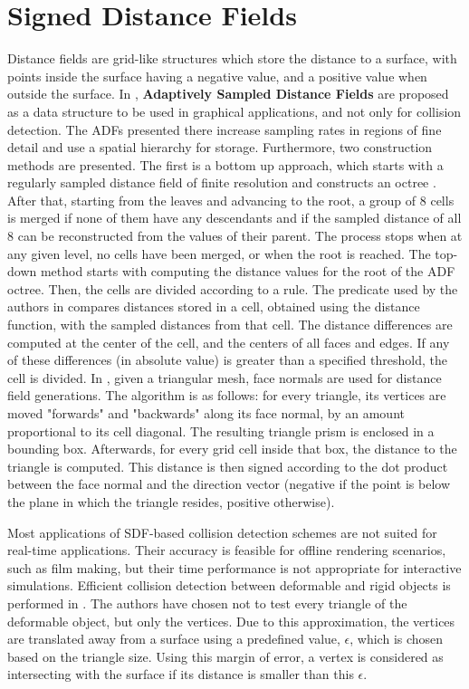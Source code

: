 \section{Signed Distance Fields}
\label{sec:sdf}

Distance fields are grid-like structures which store the distance to a surface, with points inside the surface having a negative value, and a positive value when outside the surface. In \citep{fris00}, \textbf{Adaptively Sampled Distance Fields} are proposed as a data structure to be used in graphical applications, and not only for collision detection. The ADFs presented there increase sampling rates in regions of fine detail and use a spatial hierarchy for storage. Furthermore, two construction methods are presented. The first is a bottom up approach, which starts with a regularly sampled distance field of finite resolution and constructs an octree \citep{fris00}. After that, starting from the leaves and advancing to the root, a group of 8 cells is merged if none of them have any descendants and if the sampled distance of all 8 can be reconstructed from the values of their parent. The process stops when at any given level, no cells have been merged, or when the root is reached. The top-down method starts with computing the distance values for the root of the ADF octree. Then, the cells are divided according to a rule. The predicate used by the authors in \citep{fris00} compares distances stored in a cell, obtained using the distance function, with the sampled distances from that cell. The distance differences are computed at the center of the cell, and the centers of all faces and edges. If any of these differences (in absolute value) is greater than a specified threshold, the cell is divided. In \citep{fsg03}, given a triangular mesh, face normals are used for distance field generations. The algorithm is as follows: for every triangle, its vertices are moved "forwards" and "backwards" along its face normal, by an amount proportional to its cell diagonal. The resulting triangle prism is enclosed in a bounding box. Afterwards, for every grid cell inside that box, the distance to the triangle is computed. This distance is then signed according to the dot product between the face normal and the direction vector (negative if the point is below the plane in which the triangle resides, positive otherwise).

Most applications of SDF-based collision detection schemes are not suited for real-time applications. Their accuracy is feasible for offline rendering scenarios, such as film making, but their time performance is not appropriate for interactive simulations. Efficient collision detection between deformable and rigid objects is performed in \cite{fsg03}. The authors have chosen not to test every triangle of the deformable object, but only the vertices. Due to this approximation, the vertices are translated away from a surface using a predefined value, $\epsilon$, which is chosen based on the triangle size. Using this margin of error, a vertex is considered as intersecting with the surface if its distance is smaller than this $\epsilon$.


